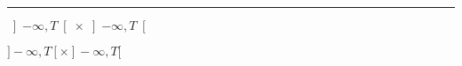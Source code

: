 \hrule
$\left]-\infty,T\right[ \times \left]-\infty,T\right[$

$]-\infty,T[ \times ]-\infty,T[$

\bye


